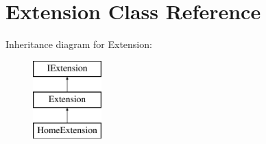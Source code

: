\hypertarget{class_extension}{
\section{Extension Class Reference}
\label{class_extension}
}
Inheritance diagram for Extension:\begin{figure}[H]
\begin{center}
\leavevmode
\includegraphics[height=3.000000cm]{class_extension}
\end{center}
\end{figure}

